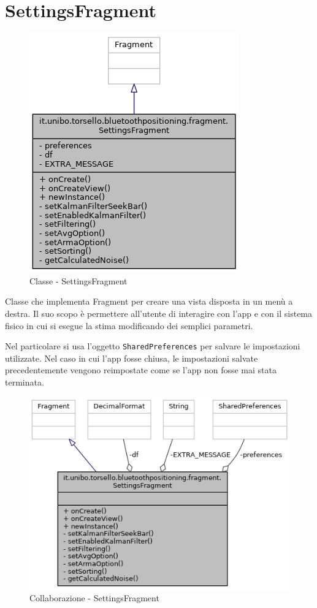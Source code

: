 \newpage
\section{SettingsFragment}
\begin{figure}[ph]
	\centering
	\includegraphics[width=0.5\linewidth]{img/uml/class/classit_1_1unibo_1_1torsello_1_1bluetoothpositioning_1_1fragment_1_1SettingsFragment__inherit__graph.png}
	\caption{Classe - SettingsFragment}
\end{figure}

Classe che implementa Fragment per creare una vista disposta in un menù a destra. Il suo scopo è permettere all'utente di interagire con l'app e con il sistema fisico in cui si esegue la stima modificando dei semplici parametri.

\newpage
Nel particolare si usa l'oggetto \texttt{SharedPreferences} per salvare le impostazioni utilizzate. Nel caso in cui l'app fosse chiusa, le impostazioni salvate precedentemente vengono reimpostate come se l'app non fosse mai stata terminata.

\begin{figure}[ph]
	\centering
	\includegraphics[width=0.8\linewidth]{img/uml/class/classit_1_1unibo_1_1torsello_1_1bluetoothpositioning_1_1fragment_1_1SettingsFragment__coll__graph.png}
	\caption{Collaborazione - SettingsFragment}
\end{figure}

